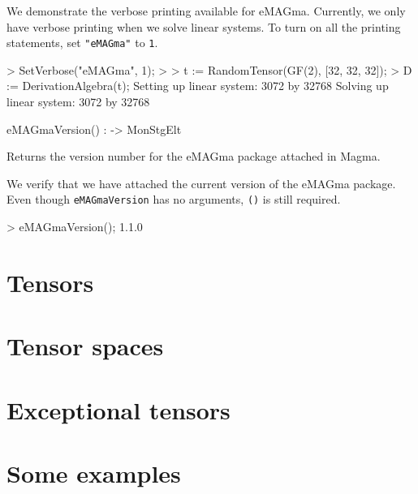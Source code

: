 \documentclass{documentation}
\begin{document}
\begin{example}[VerbosePrinting]
We demonstrate the verbose printing available for eMAGma. 
Currently, we only have verbose printing when we solve linear systems. 
To turn on all the printing statements, set {\tt "eMAGma"} to {\tt 1}. 

\begin{code}
> SetVerbose("eMAGma", 1);
> 
> t := RandomTensor(GF(2), [32, 32, 32]);
> D := DerivationAlgebra(t);
Setting up linear system: 3072 by 32768
Solving up linear system: 3072 by 32768
\end{code}
\end{example}

\begin{intrinsics}
eMAGmaVersion() : -> MonStgElt
\end{intrinsics}

Returns the version number for the eMAGma package attached in Magma.

\begin{example}[Version]
We verify that we have attached the current version of the eMAGma package.
Even though {\tt eMAGmaVersion} has no arguments, {\tt ()} is still required.

\begin{code}
> eMAGmaVersion();
1.1.0
\end{code}
\end{example}

\chapter{Tensors}\label{ch:tensors}




\chapter{Tensor spaces}\label{ch:tensor-spaces}



\chapter{Exceptional tensors}\label{ch:exceptional}



\chapter{Some examples}\label{ch:examples}
\end{document}
